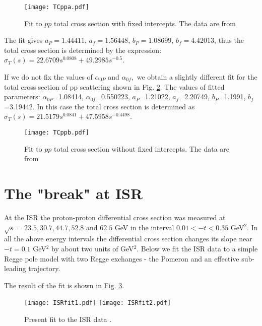\documentclass[aps,prd,superscriptaddress,showpacs,preprintnumbers]{revtex4}
\begin{document}
 \begin{figure}[H]
 	\centering
 	\texttt{[image: TCppa.pdf]}
 	\caption{Fit to $pp$ total cross section with fixed intercepts. The data are from \cite{ISR}}
 	\label{Fig:Total1}
 \end{figure}  
The fit gives $a_P=1.44411$, $a_f=1.56448$, $b_P=1.08699$, $b_f=4.42013$, thus the total cross section is determined by the expression: $\sigma_T(s)=22.6709s^{0.0808}+49.2985s^{-0.5}$.

If we do not fix the values of $\alpha_{0P}$ and $\alpha_{0f},$ we obtain a slightly different fit for the total cross section of pp scattering shown in Fig. \ref{Fig:Total2}. The values of fitted parameters:
$\alpha_{0P}$=1.08414, $\alpha_{0f}$=0.550223, $a_P$=1.21022, $a_f$=2.20749, $b_P$=1.1991, $b_f$=3.19442. In this case the total cross section is determined as $\sigma_T(s)=21.5179s^{0.0841}+47.5958s^{-0.4498}$.
\begin{figure}[H]
	\centering
	\texttt{[image: TCppb.pdf]}
	\caption{Fit to $pp$ total cross section without fixed intercepts. The data are from \cite{ISR}}
	\label{Fig:Total2}
\end{figure} 

\section{The "break" at ISR} \label{Sec:ISR}  
At the ISR the proton-proton differential cross section was measured at $\sqrt {s}=23.5, 30.7, 44.7, 52.8$ and $62.5$ GeV in the interval $0.01<-t<0.35$ GeV$^2$. In all the above energy intervals the differential cross section changes its slope near $-t=0.1$ GeV$^2$ by about two units of GeV$^2$. Below we fit the ISR data to a simple Regge pole model with two Regge exchanges - the Pomeron and an effective sub-leading trajectory.

The result of the fit is shown in Fig. \ref{Fig:ISR}.

\begin{figure}[H] 
	\centering
	\texttt{[image: ISRfit1.pdf]}
	\qquad
	\texttt{[image: ISRfit2.pdf]}
	\caption{Present fit to the ISR data \cite{ISR}.}
	\label{Fig:ISR}
\end{figure}
\end{document}
